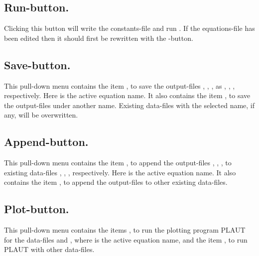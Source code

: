 \subsection{ Run-button.}
Clicking this button will write the constants-file  and run \AUTO.
If the equations-file has been edited then it should first be rewritten 
with the -button. 


\subsection{ Save-button.}
This pull-down menu contains the item
,
to save the output-files , , ,
as , , , respectively.
Here  is the active equation name.
It also contains the item
, 
to save the output-files under another name. 
Existing data-files with the selected name, if any, will be overwritten.


\subsection{ Append-button.}
This pull-down menu contains the item
,
to append the output-files , , ,
to existing data-files , , , respectively.
Here  is the active equation name.
It also contains the item
, 
to append the output-files to other existing data-files.

\subsection{ Plot-button.}
This pull-down menu contains the items
,
to run the plotting program {\cal PLAUT} for the data-files 
 and ,
where  is the active equation name,
and the item
, 
to run {\cal PLAUT} with other data-files.


